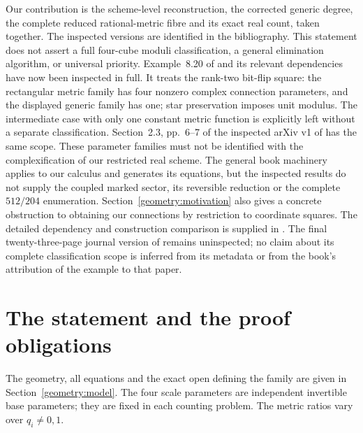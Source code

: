 \documentclass[11pt,a4paper]{article}
\theoremstyle{remark}\newtheorem{remark}[theorem]{Remark}
\begin{document}
Our contribution is the scheme-level reconstruction, the corrected
generic degree, the complete reduced rational-metric fibre and its exact
real count, taken together. The inspected versions are identified in the
bibliography. This statement does not assert a full four-cube moduli
classification, a general elimination algorithm, or universal priority.
Example~8.20 of \cite[pp.~594--598]{orig-book} and its relevant
dependencies have now been inspected in full. It treats the rank-two
bit-flip square: the rectangular metric family has four nonzero complex
connection parameters, and the displayed generic family has one; star
preservation imposes unit modulus. The intermediate case with only one
constant metric function is explicitly left without a separate
classification. Section~2.3, pp.~6--7 of the inspected arXiv v1 of
\cite{orig-square} has the same scope. These parameter families must not
be identified with the complexification of our restricted real scheme.
The general book machinery applies to our calculus and generates its
equations, but the inspected results do not supply the coupled marked
sector, its reversible reduction or the complete $512/204$ enumeration.
Section~\ref{geometry:motivation} also gives a concrete obstruction to
obtaining our connections by restriction to coordinate squares.
The detailed dependency and construction comparison is supplied in
. The final twenty-three-page
journal version of \cite{orig-square} remains uninspected; no claim about
its complete classification scope is inferred from its metadata or from
the book's attribution of the example to that paper.

\section{The statement and the proof obligations}
The geometry, all equations and the exact open defining the family are
given in Section~\ref{geometry:model}. The four scale parameters are
independent invertible base parameters; they are fixed in each counting
problem. The metric ratios vary over $q_i\ne0,1$.
\end{document}
